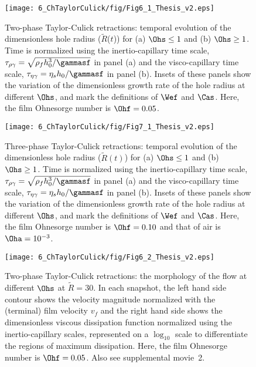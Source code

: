 \begin{sidewaysfigure}
	\centering
	\texttt{[image: 6\_ChTaylorCulick/fig/Fig6\_1\_Thesis\_v2.eps]}	
	\caption{Two-phase Taylor-Culick retractions: temporal evolution of the dimensionless hole radius ($\tilde{R}$($t$)) for (a) $\Ohs \le 1$ and (b) $\Ohs \ge 1$. Time is normalized using the inertio-capillary time scale, $\tau_{\rho\gamma} = \sqrt{\rho_f h_0^3/\gammasf}$ in panel (a) and the visco-capillary time scale, $\tau_{\eta\gamma} = \eta_s h_0/\gammasf$ in panel (b). Insets of these panels show the variation of the dimensionless growth rate of the hole radius at different $\Ohs$, and mark the definitions of $\Wef$ and $\Cas$. Here, the film Ohnesorge number is $\Ohf = 0.05$.}
	\label{Ch6:fig:two-phaseTemporal}
\end{sidewaysfigure}

\begin{sidewaysfigure}
	\centering
	\texttt{[image: 6\_ChTaylorCulick/fig/Fig7\_1\_Thesis\_v2.eps]}	
	\caption{Three-phase Taylor-Culick retractions: temporal evolution of the dimensionless hole radius ($\tilde{R}(t)$) for (a) $\Ohs \le 1$ and (b) $\Ohs \ge 1$. Time is normalized using the inertio-capillary time scale, $\tau_{\rho\gamma} = \sqrt{\rho_f h_0^3/\gammasf}$ in panel (a) and the visco-capillary time scale, $\tau_{\eta\gamma} = \eta_s h_0/\gammasf$ in panel (b). Insets of these panels show the variation of the dimensionless growth rate of the hole radius at different $\Ohs$, and mark the definitions of $\Wef$ and $\Cas$. Here, the film Ohnesorge number is $\Ohf = 0.10$ and that of air is $\Oha = 10^{-3}$.}
	\label{Ch6:fig:three-phaseTemporal}
\end{sidewaysfigure}

\begin{figure}
	\centering
	\texttt{[image: 6\_ChTaylorCulick/fig/Fig6\_2\_Thesis\_v2.eps]}	
	\caption{Two-phase Taylor-Culick retractions: the morphology of the flow at different $\Ohs$ at $\tilde{R} = 30$. In each snapshot, the left hand side contour shows the velocity magnitude normalized with the (terminal) film velocity $v_f$ and the right hand side shows the dimensionless viscous dissipation function normalized using the inertio-capillary scales, represented on a $\log_{\text{10}}$ scale to differentiate the regions of maximum dissipation. Here, the film Ohnesorge number is $\Ohf = 0.05$. Also see supplemental movie~{\color{Myfig}2}.}
	\label{Ch6:fig:two-phaseTemporal2}
\end{figure}

